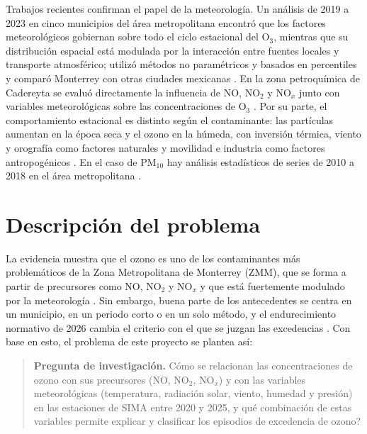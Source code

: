 \documentclass[11pt,letterpaper]{article}
\begin{document}
Trabajos recientes confirman el papel de la meteorolog\'ia. Un an\'alisis de 2019 a 2023 en cinco municipios del \'area metropolitana encontr\'o que los factores meteorol\'ogicos gobiernan sobre todo el ciclo estacional del O$_3$, mientras que su distribuci\'on espacial est\'a modulada por la interacci\'on entre fuentes locales y transporte atmosf\'erico; utiliz\'o m\'etodos no param\'etricos y basados en percentiles y compar\'o Monterrey con otras ciudades mexicanas \cite{persistent2026}. En la zona petroqu\'imica de Cadereyta se evalu\'o directamente la influencia de NO, NO$_2$ y NO$_x$ junto con variables meteorol\'ogicas sobre las concentraciones de O$_3$ \cite{cadereyta2025}. Por su parte, el comportamiento estacional es distinto seg\'un el contaminante: las part\'iculas aumentan en la \'epoca seca y el ozono en la h\'umeda, con inversi\'on t\'ermica, viento y orograf\'ia como factores naturales y movilidad e industria como factores antropog\'enicos \cite{fajardo2023}. En el caso de PM$_{10}$ hay an\'alisis estad\'isticos de series de 2010 a 2018 en el \'area metropolitana \cite{aguirre2022}.

\section{Descripci\'on del problema}
La evidencia muestra que el ozono es uno de los contaminantes m\'as problem\'aticos de la Zona Metropolitana de Monterrey (ZMM), que se forma a partir de precursores como NO, NO$_2$ y NO$_x$ y que est\'a fuertemente modulado por la meteorolog\'ia \cite{fajardo2023,persistent2026,cadereyta2025}. Sin embargo, buena parte de los antecedentes se centra en un municipio, en un periodo corto o en un solo m\'etodo, y el endurecimiento normativo de 2026 cambia el criterio con el que se juzgan las excedencias \cite{universal2025,sinaica}. Con base en esto, el problema de este proyecto se plantea as\'i:

\begin{quote}
\textbf{Pregunta de investigaci\'on.} \textquestiondown C\'omo se relacionan las concentraciones de ozono con sus precursores (NO, NO$_2$, NO$_x$) y con las variables meteorol\'ogicas (temperatura, radiaci\'on solar, viento, humedad y presi\'on) en las estaciones de SIMA entre 2020 y 2025, y qu\'e combinaci\'on de estas variables permite explicar y clasificar los episodios de excedencia de ozono?
\end{quote}
\end{document}
